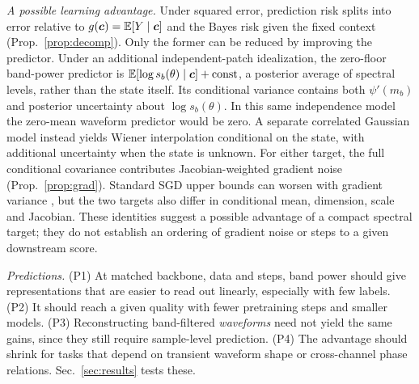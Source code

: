 \noindent\emph{A possible learning advantage.} Under squared error, prediction risk splits
into error relative to $g(\bm{c})=\mathbb{E}[Y\mid\bm{c}]$ and the Bayes risk given the fixed context
(Prop.~\ref{prop:decomp}). Only the former can be reduced by improving the predictor.
Under an additional independent-patch idealization, the zero-floor band-power predictor is
$\mathbb{E}[\log s_b(\theta)\mid\bm{c}]+\text{const}$, a posterior average of spectral levels,
rather than the state itself. Its conditional variance contains both $\psi'(m_b)$ and posterior
uncertainty about $\log s_b(\theta)$. In this same independence model the zero-mean waveform
predictor would be zero. A separate correlated Gaussian model instead yields Wiener
interpolation conditional on the state, with additional uncertainty when the state is unknown.
For either target, the full conditional covariance contributes Jacobian-weighted gradient
noise (Prop.~\ref{prop:grad}). Standard SGD upper bounds can worsen with gradient variance
\cite{ghadimi2013}, but the two targets also differ in conditional mean, dimension, scale and
Jacobian. These identities suggest a possible advantage of a compact spectral target; they do
not establish an ordering of gradient noise or steps to a given downstream score.

\noindent\emph{Predictions.} (P1) At matched backbone, data and steps, band power should give
representations that are easier to read out linearly, especially with few labels. (P2) It should
reach a given quality with fewer pretraining steps and smaller models. (P3) Reconstructing
band-filtered \emph{waveforms} need not yield the same gains, since they still require sample-level prediction.
(P4) The advantage should shrink for tasks that depend on transient waveform shape or
cross-channel phase relations. Sec.~\ref{sec:results} tests these.
